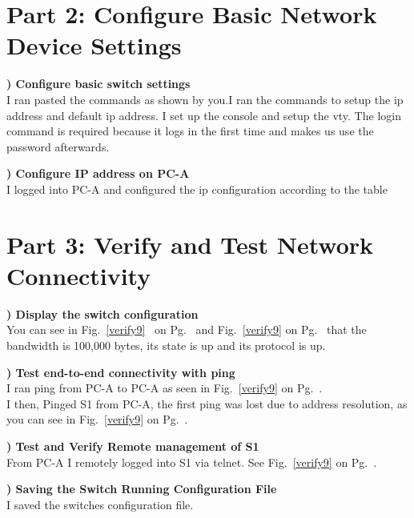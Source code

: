 \documentclass{report}
\newcommand{\mysection}[1]{\section*{#1}}
\newcommand{\mysubsection}[2]{\textbf{\romannumeral #1) #2}}
\begin{document}
\clearpage


\mysection{\textbf{Part 2: Configure Basic Network Device Settings}}


\mysubsection{1}{Configure basic switch settings}
\\I ran pasted the commands as shown by you.I ran the commands to setup the ip 
address and default ip address. I set up the console and setup the vty. 
The login command is required because it logs in
the first time and makes us use the password afterwards.
\hfill\break

\noindent\mysubsection{2}{Configure IP address on PC-A}
\\I logged into PC-A and configured the ip configuration according to the table

\mysection{\textbf{Part 3: Verify and Test Network Connectivity}}

\mysubsection{1}{Display the switch configuration}
\\You can see in Fig.~\ref{verify9}~ 
on Pg.~\pageref{verify9} and Fig.~\ref{verify9} on
Pg.~\pageref{verify9} that the bandwidth is 100,000 bytes,  its state is up and
its protocol is up.
\hfill\break

\noindent\mysubsection{2}{Test end-to-end connectivity with ping}
\\I ran ping from PC-A to PC-A as seen in
Fig.~\ref{verify9} on Pg.~\pageref{verify9}.
\\I then, Pinged S1 from PC-A, the first ping was lost due to address
resolution, as you can see in Fig.~\ref{verify9} on
Pg.~\pageref{verify9}.
\hfill\break

\noindent\mysubsection{3}{Test and Verify Remote management of S1}
\\From PC-A I remotely logged into S1 via telnet. See
Fig.~\ref{verify9} on Pg.~\pageref{verify9}.
\hfill\break

\noindent\mysubsection{4}{Saving the Switch Running Configuration File}
\\I saved the switches configuration file.
\end{document}
